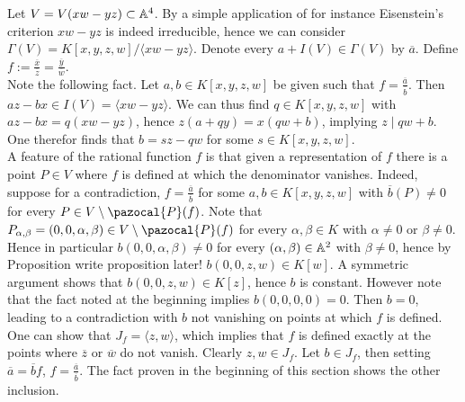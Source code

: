\begin{example}
    Let $V=V(xw-yz)\subset \mathbb{A}^4$. By a simple application of for instance Eisenstein's criterion $xw-yz$ is indeed irreducible, hence we can consider $\Gamma(V)=K[x,y,z,w]/\langle xw-yz\rangle$. 
    Denote every $a+I(V)\in \Gamma(V)$ by $\overline{a}$. Define $f := \frac{\overline{x}}{\overline{z}} = \frac{\overline{y}}{\overline{w}}$.\\
     Note the following fact. Let $a,b\in K[x,y,z,w]$ be given such that $f= \frac{\overline{a}}{\overline{b}}$. Then $az-bx\in I(V) = \langle xw-yz\rangle$. We can thus find $q\in K[x,y,z,w]$ with $az-bx = q(xw-yz)$, hence $z(a+qy)=x(qw+b)$, implying $z\mid qw+b$. One therefor finds that $b=sz-qw$ for some $s\in K[x,y,z,w]$.\\
    A feature of the rational function $f$ is that given a representation of $f$ there is a point $P\in V$ where $f$ is defined at which the denominator vanishes. Indeed, suppose for a contradiction, $f= \frac{\overline{a}}{\overline{b}}$ for some $a,b\in K[x,y,z,w]$ with $\overline{b}(P)\neq 0$ for every $P\in V\setminus \pazocal{P}(f)$. Note that $P_{\alpha,\beta}=(0,0,\alpha, \beta)\in V\setminus \pazocal{P}(f)$ for every $\alpha,\beta\in K$ with $\alpha\neq 0$ or $\beta\neq0$. Hence in particular $b(0,0,\alpha,\beta)\neq0 $ for every $(\alpha,\beta)\in \mathbb{A}^2$ with $\beta\neq0$, hence by Proposition {\Large write proposition later!} $b(0,0,z,w)\in K[w]$. A symmetric argument shows that $b(0,0,z,w)\in K[z]$, hence $b$ is constant. However note that the fact noted at the beginning implies $b(0,0,0,0)=0$. Then $b=0$, leading to a contradiction with $b$ not vanishing on points at which $f$ is defined.\\ 
    One can show that $J_f = \langle z,w\rangle$, which implies that $f$ is defined exactly at the points where $\overline{z}$ or $\overline{w}$ do not vanish. Clearly $z,w\in J_f$. Let $b\in J_f$, then setting $\overline{a}=\overline{b}f$, $f = \frac{\overline{a}}{\overline{b}}$. The fact proven in the beginning of this section shows the other inclusion.\\  
\end{example}
